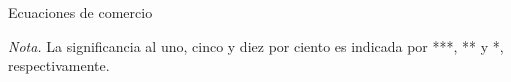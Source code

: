 \documentclass[12pt]{beamer}
\begin{document}
\begin{frame}{Ecuaciones de comercio}
\begin{table}
\begin{center}
\begin{threeparttable}
\begin{tablenotes}
\small
 \item  \emph{Nota.} La significancia al uno, cinco y diez por ciento es indicada por ***, ** y *, respectivamente.
\end{tablenotes}								
\end{threeparttable}					
\end{center}
\label{Rec}	
\end{table}	
\end{frame}
\end{document}
